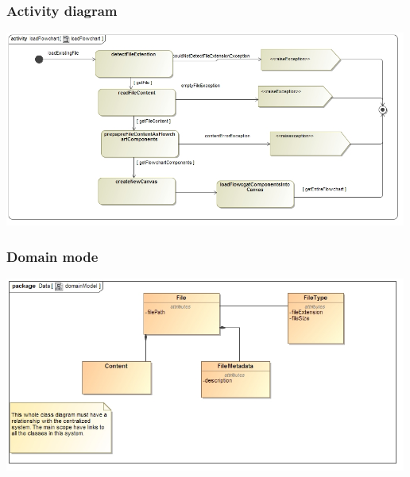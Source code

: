 \documentclass[11pt,a4paper,titlepage]{article}
\begin{document}
\subsubsection{Activity diagram}
\includegraphics[width=500px]{loadFlowchart_activity_diagram.jpg}

\subsubsection{Domain mode}
\includegraphics[width=500px]{loadFlowchart_domain_model.jpg}
\end{document}
